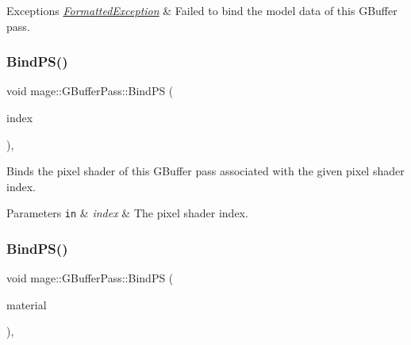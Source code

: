 \begin{DoxyExceptions}{Exceptions}
{\em \hyperlink{classmage_1_1_formatted_exception}{Formatted\+Exception}} & Failed to bind the model data of this G\+Buffer pass. \\
\hline
\end{DoxyExceptions}
\hypertarget{classmage_1_1_g_buffer_pass_a750c27aa6f562b53d62f845ce50e731d}{}\label{classmage_1_1_g_buffer_pass_a750c27aa6f562b53d62f845ce50e731d} 
\subsubsection{\texorpdfstring{Bind\+P\+S()}{BindPS()}\hspace{0.1cm}{\footnotesize\ttfamily [1/2]}}
{\footnotesize\ttfamily void mage\+::\+G\+Buffer\+Pass\+::\+Bind\+PS (\begin{DoxyParamCaption}\item[{\hyperlink{classmage_1_1_g_buffer_pass_a1dbae3cb33d9c90ce7eb8c119d576379}{P\+S\+Index}}]{index }\end{DoxyParamCaption})\hspace{0.3cm}{\ttfamily [private]}, {\ttfamily [noexcept]}}

Binds the pixel shader of this G\+Buffer pass associated with the given pixel shader index.


\begin{DoxyParams}[1]{Parameters}
\mbox{\tt in}  & {\em index} & The pixel shader index. \\
\hline
\end{DoxyParams}
\hypertarget{classmage_1_1_g_buffer_pass_acf03db3d75a3dbacb5c002f6bc72e5ee}{}\label{classmage_1_1_g_buffer_pass_acf03db3d75a3dbacb5c002f6bc72e5ee} 
\subsubsection{\texorpdfstring{Bind\+P\+S()}{BindPS()}\hspace{0.1cm}{\footnotesize\ttfamily [2/2]}}
{\footnotesize\ttfamily void mage\+::\+G\+Buffer\+Pass\+::\+Bind\+PS (\begin{DoxyParamCaption}\item[{const \hyperlink{classmage_1_1_material}{Material} $\ast$}]{material }\end{DoxyParamCaption})\hspace{0.3cm}{\ttfamily [private]}, {\ttfamily [noexcept]}}

